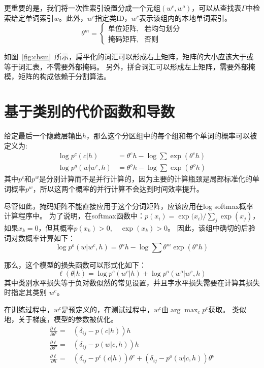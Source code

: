 更重要的是，我们将一次性索引设置分成一个元组$(w ^ c,w ^ o)$，可以从查找表$\Gamma $中检索给定单词索引$ w $。此外，$ w ^ c $指定类ID，$ w^c $表示该组内的本地单词索引。
\begin{equation}\label{equ:partition}
 \theta^m=
\begin{cases}
    \text{单位矩阵} ,& \text{若均匀划分} \\
    \text{掩码矩阵},   & \text{否则}
\end{cases}
\end{equation}


如图~\ref{fig:chsm}~所示，扁平化的词汇可以形成右上矩阵，矩阵的大小应该大于或等于词汇表，不需要外部掩码。
另外，拼合词汇可以形成左上矩阵，需要外部掩模，矩阵的构成依赖于分割算法。

\section{基于类别的代价函数和导数}
给定最后一个隐藏层输出$ h $，那么这个分区组中的每个组和每个单词的概率可以被定义为:
\begin{equation}
\begin{split}
\log p^c(c|h) &= \theta^c h-\log \sum{\exp( \theta^c h )} \\
\log p^g(w|w^c,h)&=\theta^o h -\log\sum\exp{(\theta^o h)}
\end{split}
\end{equation}
其中$ p ^ c $和$ p ^ w $是分别计算而不是并行计算的，因为主要的计算瓶颈是局部标准化的单词概率$ p ^ w $，所以这两个概率的并行计算不会达到时间效率提升。


尽管如此，掩码矩阵不能直接应用于这个分词矩阵，应该应用在log softmax概率计算程序中。 为了说明，在softmax函数中：$ p(x_i)= {\exp({x_i}})/ {\sum_j \exp(x_j)} $，如果$ x_k = 0 $，但其概率$ p(x_k)> 0,\quad \exp(x_k)> 0 $。 因此，该组中确切的后验词对数概率计算如下：
\begin{equation}
  \log p^o(w|w^c,h)=\theta^o h -\log\sum\theta^m\exp(\theta^o h)
\end{equation}

那么，这个模型的损失函数可以形式化如下：
\begin{equation}
\ell(\theta|h) =\log p^c(w^c|h) +\log p^o(w^o|w^c,h)
\end{equation}
其中类别水平损失等于负对数似然的常见设置，并且字水平损失需要在计算其损失时指定其类别 $ w ^ c $。

在训练过程中，$ w ^ c $是预定义的，在测试过程中，$ w ^ c $由$ \arg\max_c p ^ c $获取。 类似地，关于梯度，模型的参数被优化。
\begin{equation}
\begin{split}
\frac{\partial \ell}{\partial \theta^c}=& (\delta_{ij}-p(c|h))h \\
\frac{\partial \ell}{\partial \theta^o}=&(\delta_{ij}-p(w|c,h))h \\
\frac{\partial \ell}{\partial h}=&(\delta_{ij}-p^c(c|h))\theta^c + (\delta_{ij}-p^o(w|c,h))\theta^o
\end{split}
\end{equation}

